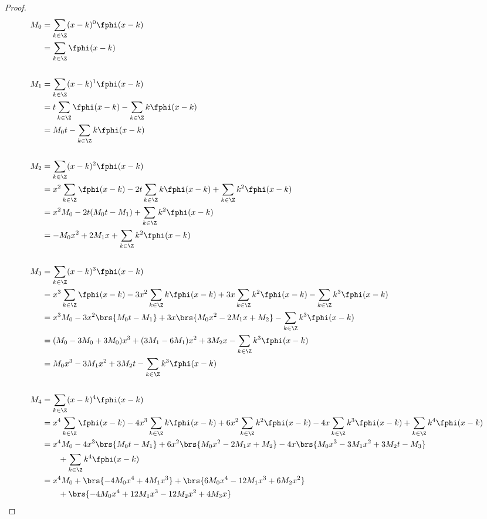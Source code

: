 \begin{proof}
\begin{align*}
  M_0
    &= \sum_{k\in\Z} (x-k)^0 \fphi(x-k)
  \\&= \sum_{k\in\Z} \fphi(x-k)
  \\
  \\
  M_1
    &= \sum_{k\in\Z} (x-k)^1 \fphi(x-k)
  \\&= t \sum_{k\in\Z} \fphi(x-k) - \sum_{k\in\Z} k \fphi(x-k)
  \\&= M_0t  - \sum_{k\in\Z} k \fphi(x-k)
  \\
  \\
  M_2
    &= \sum_{k\in\Z} (x-k)^2 \fphi(x-k)
  \\&= x^2 \sum_{k\in\Z}\fphi(x-k) - 2t \sum_{k\in\Z} k\fphi(x-k) + \sum_{k\in\Z} k^2 \fphi(x-k)
  \\&= x^2 M_0 - 2t(M_0t - M_1) + \sum_{k\in\Z} k^2 \fphi(x-k)
  \\&= -M_0x^2 + 2M_1x + \sum_{k\in\Z} k^2 \fphi(x-k)
  \\
  \\
  M_3
    &= \sum_{k\in\Z} (x-k)^3 \fphi(x-k)
  \\&=  x^3 \sum_{k\in\Z}     \fphi(x-k)
      - 3x^2 \sum_{k\in\Z} k   \fphi(x-k)
      + 3x   \sum_{k\in\Z} k^2 \fphi(x-k)
      -      \sum_{k\in\Z} k^3 \fphi(x-k)
  \\&=  x^3 M_0
      - 3x^2 \brs{ M_0t - M_1 }
      + 3x   \brs{ M_0x^2 - 2M_1x + M_2 }
      -      \sum_{k\in\Z} k^3 \fphi(x-k)
  \\&= (M_0-3M_0+3M_0)x^3 + (3M_1-6M_1)x^2 + 3M_2 x -\sum_{k\in\Z} k^3 \fphi(x-k)
  \\&= M_0x^3 -3M_1 x^2 + 3M_2t - \sum_{k\in\Z} k^3 \fphi(x-k)
  \\
  \\
  M_4
    &= \sum_{k\in\Z} (x-k)^4  \fphi(x-k)
  \\&=  x^4 \sum_{k\in\Z}     \fphi(x-k)
      - 4x^3 \sum_{k\in\Z} k   \fphi(x-k)
      + 6x^2 \sum_{k\in\Z} k^2 \fphi(x-k)
      - 4x   \sum_{k\in\Z} k^3 \fphi(x-k)
      +      \sum_{k\in\Z} k^4 \fphi(x-k)
  \\&=  x^4 M_0
      - 4x^3 \brs{ M_0t   -  M_1  }
      + 6x^2 \brs{ M_0x^2 - 2M_1x   + M_2  }
      - 4x   \brs{ M_0x^3 - 3M_1x^2 + 3M_2t - M_3  }
      \\&\qquad+      \sum_{k\in\Z} k^4 \fphi(x-k)
  \\&=  x^4 M_0
      + \brs{ - 4M_0x^4   + 4M_1x^3  }
      + \brs{ 6M_0x^4 - 12M_1x^3  + 6M_2x^2  }
      \\&\qquad+ \brs{ - 4M_0x^4 + 12M_1x^3 - 12M_2x^2 + 4M_3x  }

\end{align*}
\end{proof}
